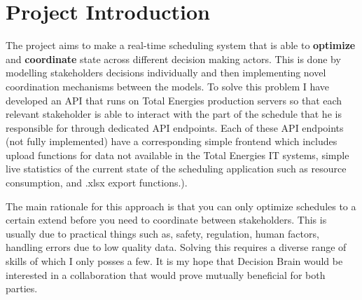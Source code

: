\section{Project Introduction}

The project aims to make a real-time scheduling system that is able to \textbf{optimize} and \textbf{coordinate} state across
different decision making actors. This is done by modelling stakeholders decisions individually and then implementing novel coordination
mechanisms between the models. To solve this problem I have developed an API that runs on Total
Energies production servers so that each relevant stakeholder is able to interact with the part 
of the schedule that he is responsible for through dedicated API endpoints. Each of these API 
endpoints (not fully implemented) have a corresponding simple frontend which includes upload functions for data not available 
in the Total Energies IT systems, simple live statistics of the current state 
of the scheduling application such as resource consumption, and .xlsx export functions.).

The main rationale for this approach is that you can only optimize schedules to a certain extend before you need to coordinate between 
stakeholders. This is usually due to practical things such as, safety, regulation, human factors, handling errors due to low quality data. 
Solving this requires a diverse range of skills of which I only posses a few. It is my hope that Decision Brain
would be interested in a collaboration that would prove mutually beneficial for both parties. 

